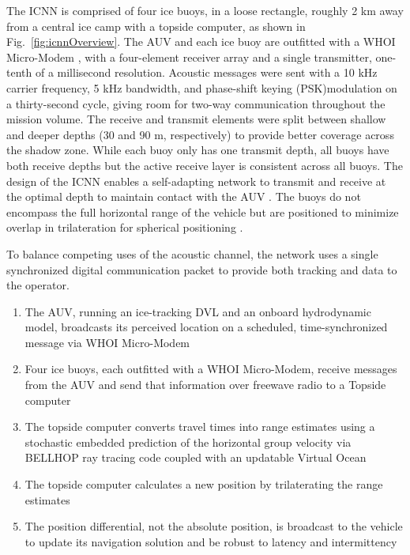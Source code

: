 The ICNN is comprised of four ice buoys, in a loose rectangle, roughly 2 km away from a central ice camp with a topside computer, as shown in Fig.~\ref{fig:icnnOverview}.
The AUV and each ice buoy are outfitted with a WHOI Micro-Modem \citep{Singh2006}, with a four-element receiver array and a single transmitter, one-tenth of a millisecond resolution.
Acoustic messages were sent with a 10 kHz carrier frequency, 5 kHz bandwidth, and phase-shift keying (PSK)modulation on a thirty-second cycle, giving room for two-way communication throughout the mission volume.
The receive and transmit elements were split between shallow and deeper depths (30 and 90 m, respectively) to provide better coverage across the shadow zone.
While each buoy only has one transmit depth, all buoys have both receive depths but the active receive layer is consistent across all buoys. 
The design of the ICNN enables a self-adapting network to transmit and receive at the optimal depth to maintain contact with the AUV \citep{Schneider2020}.
The buoys do not encompass the full horizontal range of the vehicle but are positioned to minimize overlap in trilateration for spherical positioning \citep{Deffenbaugh1996}.

To balance competing uses of the acoustic channel, the network uses a single synchronized digital communication packet to provide both tracking and data to the operator.
\begin{enumerate}
\item The AUV, running an ice-tracking DVL and an onboard hydrodynamic model, broadcasts its perceived location on a scheduled, time-synchronized message via WHOI Micro-Modem
\item Four ice buoys, each outfitted with a WHOI Micro-Modem, receive messages from the AUV and send that information over freewave radio to a Topside computer
\item The topside computer converts travel times into range estimates using a stochastic embedded prediction of the horizontal group velocity via BELLHOP ray tracing code \citep{Porter2011} coupled with an updatable Virtual Ocean \citep{Schneider2018,bhatt_embedded_2022}
\item The topside computer calculates a new position by trilaterating the range estimates
\item The position differential, not the absolute position, is broadcast to the vehicle to update its navigation solution and be robust to latency and intermittency
\end{enumerate}

